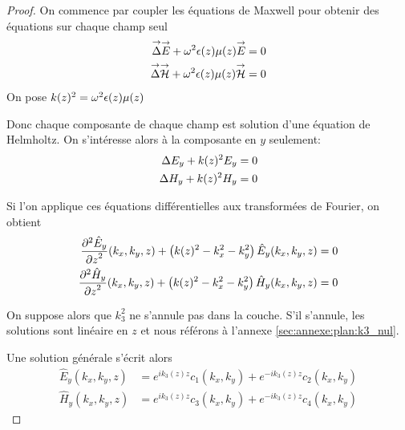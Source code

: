     \begin{proof}
      On commence par coupler les équations de Maxwell pour obtenir des équations sur chaque champ seul
      \begin{align*}
          \vlapl{\vE} + \w^2\eps(z)\mu(z) \vE & = 0
          \\
          \vlapl{\vH} + \w^2\eps(z)\mu(z) \vH & = 0
      \end{align*}
      On pose \(k(z)^2=\w^2\eps(z)\mu(z)\)

      Donc chaque composante de chaque champ est solution d'une équation de Helmholtz. On s’intéresse alors à la composante en \(y\) seulement:
      \begin{align*}
          \lapl{E_y} + k(z)^2 E_y & = 0
          \\
          \lapl{H_y} + k(z)^2 H_y & = 0
      \end{align*}

      Si l'on applique ces équations différentielles aux transformées de Fourier, on obtient
      \begin{align*}
          \ddr[2]{z}{\hat{E}_y}(k_x,k_y,z) + \left( k(z)^2 - k_x^2 - k_y^2\right) \hat{E}_y(k_x,k_y,z) & = 0
          \\
          \ddr[2]{z}{\hat{H}_y}(k_x,k_y,z) + \left( k(z)^2 - k_x^2 - k_y^2\right) \hat{H}_y(k_x,k_y,z) & = 0
      \end{align*}

      On suppose alors que \(k_3^2\) ne s'annule pas dans la couche. S'il s'annule, les solutions sont linéaire en \(z\) et nous référons à l'annexe \ref{sec:annexe:plan:k3_nul}.

      Une solution générale s'écrit alors
      \begin{align*}
          \hat{E}_y(k_x,k_y,z) & = e^{ik_3(z)z}c_1(k_x,k_y) + e^{-ik_3(z)z}c_2(k_x,k_y)
          \\
          \hat{H}_y(k_x,k_y,z) & = e^{ik_3(z)z}c_3(k_x,k_y) + e^{-ik_3(z)z}c_4(k_x,k_y)
      \end{align*}
    \end{proof}


